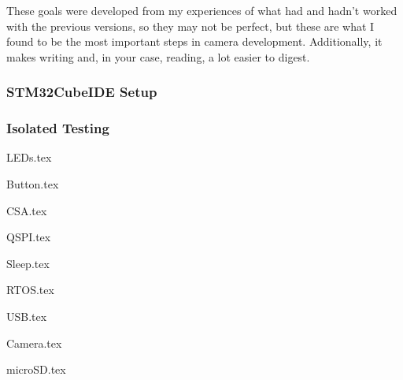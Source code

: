 These goals were developed from my experiences of what had and hadn't worked with the previous versions, so they may not be perfect, but these are what I found to be the most important steps in camera development. Additionally, it makes writing and, in your case, reading, a lot easier to digest.

\subsubsection{STM32CubeIDE Setup}

\subsubsection{Isolated Testing}

        {LEDs.tex}

        {Button.tex}

        {CSA.tex}

        {QSPI.tex}

        {Sleep.tex}

        {RTOS.tex}

        {USB.tex}

        {Camera.tex}

        {microSD.tex}